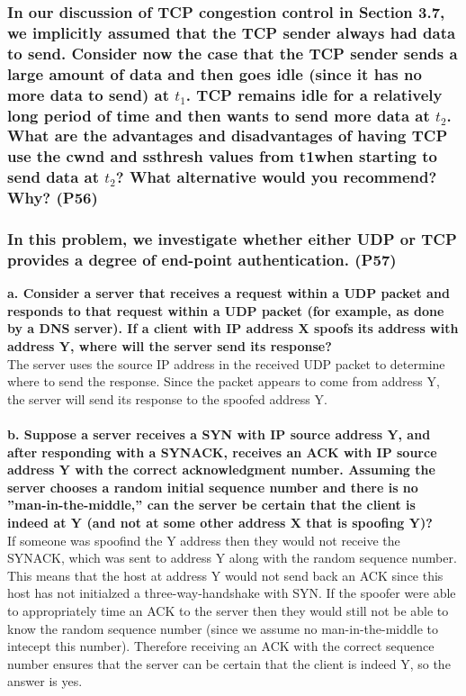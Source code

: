 \subsubsection{In our discussion of TCP congestion control in Section 3.7, we implicitly assumed that the TCP sender always had data to send. Consider now the case that the TCP sender sends a large amount of data and then goes idle (since it has no more data to send) at $t_1$. TCP remains idle for a relatively long period of time and then wants to send more data at $t_2$. What are the advantages and disadvantages of having TCP use the cwnd and ssthresh values from t1when starting to send data at $t_2$? What alternative would you recommend? Why? (P56)}


\subsubsection{In this problem, we investigate whether either UDP or TCP provides a degree of end-point authentication. (P57)}

\textbf{a. Consider a server that receives a request within a UDP packet and responds to that request within a UDP packet (for example, as done by a DNS server). If a client with IP address X spoofs its address with address Y, where will the server send its response?} \\
The server uses the source IP address in the received UDP packet to determine where to send the response. Since the packet appears to come from address Y, the server will send its response to the spoofed address Y. \\
\\
\textbf{b. Suppose a server receives a SYN with IP source address Y, and after responding with a SYNACK, receives an ACK with IP source address Y with the correct acknowledgment number. Assuming the server chooses a random initial sequence number and there is no ''man-in-the-middle,'' can the server be certain that the client is indeed at Y (and not at some other address X that is spoofing Y)?} \\
If someone was spoofind the Y address then they would not receive the SYNACK, which was sent to address Y along with the random sequence number. This means that the host at address Y would not send back an ACK since this host has not initialzed a three-way-handshake with SYN. If the spoofer were able to appropriately time an ACK to the server then they would still not be able to know the random sequence number (since we assume no man-in-the-middle to intecept this number). Therefore receiving an ACK with the correct sequence number ensures that the server can be certain that the client is indeed Y, so the answer is yes.

